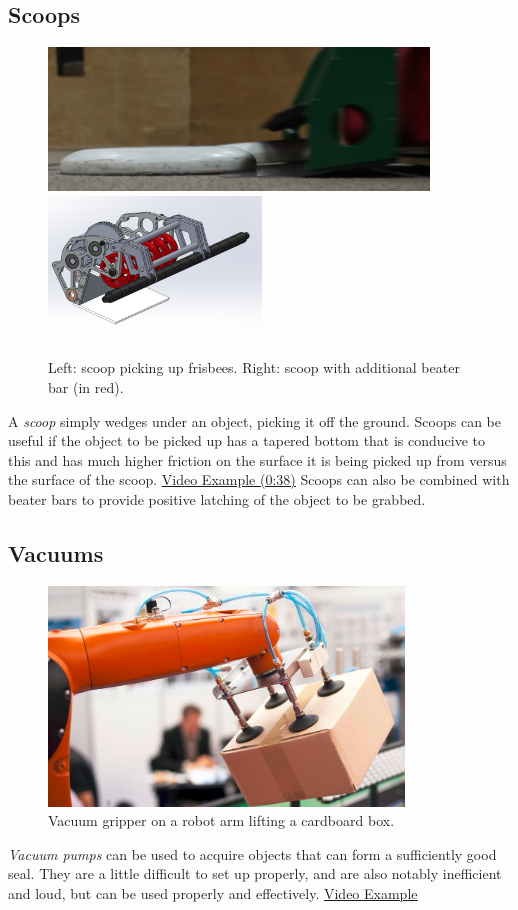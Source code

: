 \subsection{Scoops}
\begin{figure}[H]
	\includegraphics[height=1.5in]{imgs/scoop.png}
	\includegraphics[height=1.5in]{imgs/scoop_roller.png}
	\caption{Left: scoop picking up frisbees. Right: scoop with additional beater bar (in red).}
\end{figure}
A \textit{scoop} simply wedges under an object, picking it off the ground. Scoops can be useful if the object to be picked up has a tapered bottom that is conducive to this and has much higher friction on the surface it is being picked up from versus the surface of the scoop. \href{https://youtu.be/uKy-IKDq_6o?t=38}{\color{red}\underline{Video Example (0:38)}} Scoops can also be combined with beater bars to provide positive latching of the object to be grabbed.
\subsection{Vacuums}
\begin{figure}[H]
	\includegraphics[height=2.3in]{imgs/gripper_vacuum.png}
	\caption{Vacuum gripper on a robot arm lifting a cardboard box.}
\end{figure}
\textit{Vacuum pumps} can be used to acquire objects that can form a sufficiently good seal. They are a little difficult to set up properly, and are also notably inefficient and loud, but can be used properly and effectively. \href{https://www.youtube.com/watch?v=T2goz1ghXXk}{\color{red}\underline{Video Example}}

